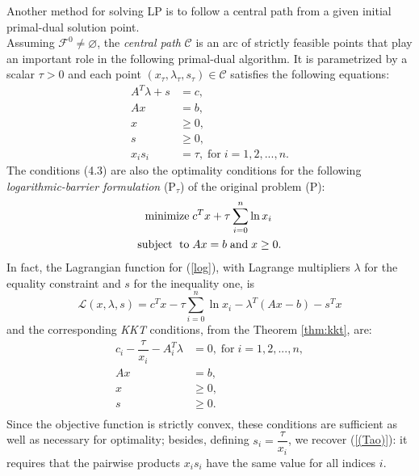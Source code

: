 \documentclass[a4paper,10 pt,titlepage,twoside]{book}
\theoremstyle{plain}
\theoremstyle{definition}
\theoremstyle{remark}
\begin{document}
Another method for solving LP is to follow a central path from a given initial primal-dual solution point.\\ Assuming $\mathcal{F}^{0}\neq \varnothing$, the \textit{central path} $\mathcal{C}$ is an arc of strictly feasible points that play an important role in the following primal-dual algorithm. It is parametrized by a scalar $\tau  > 0$ and each point $(x_{\tau}, \lambda_{\tau}, s_{\tau})\in \mathcal{C}$ satisfies the following equations:
\begin{align}
A^{T}\lambda+s&=c,\tag{4.3a}\\
Ax&=b,\tag{4.3b}\\\label{KKT2}
x&\geq 0,\tag{4.3c}\\
s&\geq 0,\tag{4.3d}\\
x_{i}s_{i}&= \tau,\; \text{for}\;i= 1,2,...,n.\tag{4.3e}\label{(Tao)}
\end{align} 
The conditions (4.3) are also the optimality conditions for the following \textit{logarithmic-barrier formulation} (P$_{\tau}$) of the original problem (P):
\begin{equation}\label{log}
\begin{split}
\text{minimize\;} &c^{T}x + \tau\sum_{i=0}^{n}\ln{x_{i}}\\
\text{subject\; to\;}&Ax = b\;\text{and\;} x\geq0.
\end{split}
\end{equation}
In fact, the Lagrangian function for (\ref{log}), with Lagrange multipliers $\lambda$ for the equality constraint and $s$ for the inequality one, is
\begin{equation*}
\mathcal{L}(x,\lambda,s)=c^{T}x- \tau\sum_{i=0}^{n}\ln{x_{i}}-\lambda^{T}\left(Ax-b\right)-s^{T}x
\end{equation*}
and the corresponding \textit{KKT} conditions, from the Theorem \ref{thm:kkt}, are:
\begin{align*}
c_{i} - \dfrac{\tau}{x_{i}} - A^{T}_{i}\lambda&= 0,\; \text{for}\;i = 1,2,...,n,\\
Ax&=b,\\
x&\geq 0,\\
s&\geq 0.\\
\end{align*}  
Since the objective function is strictly convex, these conditions are sufficient as well as necessary for optimality; besides, defining $s_{i} = \dfrac{\tau}{x_{i}}$, we recover (\ref{(Tao)}): it requires that the pairwise products $x_{i}s_{i}$ have the same value for all indices $i$.\\[0.5cm]
\end{document}
